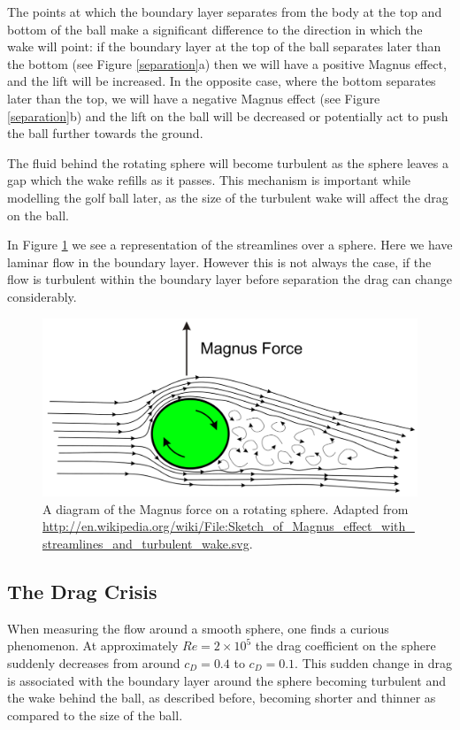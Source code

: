 The points at which the boundary layer separates from the body at the top and
bottom of the ball make a significant difference to the direction in which the wake will point: if
the boundary layer at the top of the ball separates later than the bottom (see Figure \ref{separation}a) 
then we will have a positive Magnus effect, and the lift will be increased. In the opposite case, 
where the bottom separates later than the top, we will have a negative Magnus effect 
(see Figure \ref{separation}b) and the lift on the ball will be decreased or potentially act to
push the ball further towards the ground.

The fluid behind the rotating sphere will become turbulent as the sphere leaves a gap which the wake
refills as it passes. This mechanism is important while modelling the golf ball later, as the size
of the turbulent wake will affect the drag on the ball.

In Figure \ref{magnus} we see a representation of the streamlines over a sphere. Here we have laminar
flow in the boundary layer. However this is not always the case, if the flow is turbulent within the boundary
layer before separation the drag can change considerably. 

\begin{figure}[h]
\centering
\includegraphics[scale=0.45]{../images/magnus.pdf}
\caption[A diagram of the Magnus effect]{A diagram of the Magnus force on a rotating sphere.
Adapted from \url{http://en.wikipedia.org/wiki/File:Sketch_of_Magnus_effect_with_streamlines_and_turbulent_wake.svg}.}
\label{magnus}
\end{figure}

\subsection{The Drag Crisis} \label{sec:drag-crisis}

When measuring the flow around a smooth sphere, one finds a curious phenomenon. At approximately
$Re = 2\times10^5$ the drag coefficient on the sphere suddenly decreases from around $c_D = 0.4$ 
to $c_D = 0.1$. This sudden change in drag is associated with the boundary layer around the sphere
becoming turbulent and the wake behind the ball, as described before, becoming shorter and thinner as
compared to the size of the ball.

